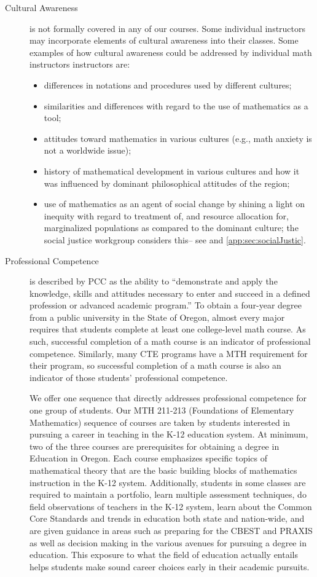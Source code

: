 \begin{description}
\item[Cultural Awareness] is not formally covered in any of our courses.  Some
  individual instructors may incorporate elements of cultural awareness into
  their classes.  Some examples of how cultural awareness could be addressed by
  individual math instructors instructors are: 
\begin{itemize}
\item differences in notations and procedures used by different cultures;
\item similarities and differences with regard to the use of mathematics as a
  tool;
\item attitudes toward mathematics in various cultures (e.g., math anxiety is
  not a worldwide issue);
\item history of mathematical  development in various cultures and how it was
  influenced by dominant philosophical attitudes of the region;
\item use of mathematics as an agent of social change by shining a light on
  inequity with regard to treatment of, and resource allocation for,
  marginalized populations as compared to the dominant culture; the social
  justice workgroup considers this-- see  and
  \vref{app:sec:socialJustic}. 
\end{itemize}

\item[Professional Competence] is described by PCC as the ability to
  ``demonstrate and apply the knowledge, skills and attitudes necessary to enter
  and succeed in a defined profession or advanced academic program.'' To obtain
  a four-year degree from a public university in the State of Oregon, almost
  every major requires that students complete at least one college-level math
  course.  As such, successful completion of a math course is an indicator of
  professional competence.  Similarly, many CTE programs have a MTH requirement
  for their program, so successful completion of a math course is also an
  indicator of those students' professional competence. 

We offer one sequence that directly addresses professional competence for one
group of students.  Our  MTH 211-213 (Foundations of Elementary Mathematics)
sequence of courses are taken by students interested in pursuing a career in
teaching in the K-12 education system.  At minimum, two of the three courses are
prerequisites for obtaining a degree in Education in Oregon.  Each course
emphasizes specific topics of mathematical theory that are the basic building
blocks of mathematics instruction in the K-12 system.  Additionally, students in
some classes are required to maintain a portfolio, learn multiple assessment
techniques, do field observations of teachers in the K-12 system, learn about
the Common Core Standards and trends in education both state and nation-wide,
and are given guidance in areas such as preparing for the CBEST and PRAXIS as
well as decision making in the various avenues for pursuing a degree in
education.  This exposure to what the field of education actually entails  helps
students make sound career choices early in their academic pursuits.


\end{description}

